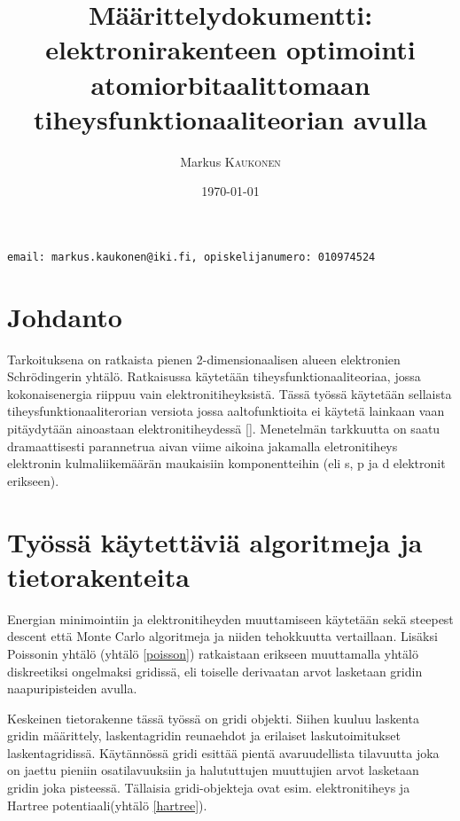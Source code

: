\documentclass{article}
\title{Määrittelydokumentti: elektronirakenteen optimointi atomiorbitaalittomaan tiheysfunktionaaliteorian avulla} %
\author{Markus \textsc{Kaukonen} %
}
\date{\today} %
\begin{document}
\maketitle %
\hspace{1cm} \texttt{email: markus.kaukonen@iki.fi, opiskelijanumero: 010974524}

\newpage


\section{Johdanto}
Tarkoituksena on ratkaista pienen 2-dimensionaalisen alueen
elektronien Schrödingerin yhtälö. Ratkaisussa käytetään
tiheysfunktionaaliteoriaa, jossa kokonaisenergia riippuu vain
elektronitiheyksistä. Tässä työssä käytetään sellaista
tiheysfunktionaaliterorian versiota jossa aaltofunktioita ei käytetä
lainkaan vaan pitäydytään ainoastaan elektronitiheydessä
[\cite{ke2013angular}]. Menetelmän tarkkuutta on saatu dramaattisesti
parannetrua aivan viime aikoina jakamalla eletronitiheys elektronin
kulmaliikemäärän maukaisiin komponentteihin (eli s, p ja d elektronit
erikseen).

\section{Työssä käytettäviä algoritmeja ja tietorakenteita}
Energian minimointiin ja elektronitiheyden muuttamiseen käytetään sekä
steepest descent että Monte Carlo algoritmeja ja niiden tehokkuutta
vertaillaan. Lisäksi Poissonin yhtälö (yhtälö \ref{poisson}) ratkaistaan
erikseen muuttamalla yhtälö diskreetiksi ongelmaksi gridissä, eli
toiselle derivaatan arvot lasketaan gridin naapuripisteiden avulla.

Keskeinen tietorakenne tässä työssä on gridi objekti. Siihen kuuluu
laskenta gridin määrittely, laskentagridin reunaehdot ja erilaiset
laskutoimitukset laskentagridissä. Käytännössä gridi esittää pientä
avaruudellista tilavuutta joka on jaettu pieniin osatilavuuksiin ja
halututtujen muuttujien arvot lasketaan gridin joka
pisteessä. Tällaisia gridi-objekteja ovat esim. elektronitiheys ja
Hartree potentiaali(yhtälö \ref{hartree}).
\end{document}
